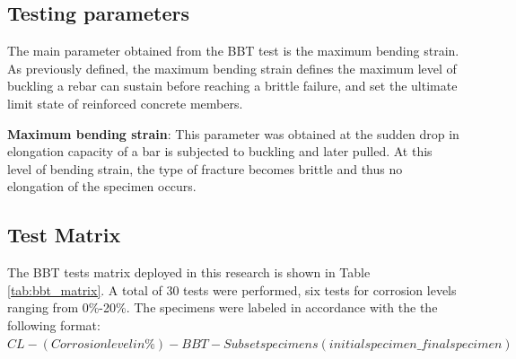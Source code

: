 \newpage

\subsection{Testing parameters}

The main parameter obtained from the BBT test is the maximum bending strain. As previously defined, the maximum bending strain defines the maximum level of buckling a rebar can sustain before reaching a brittle failure, and set the ultimate limit state of reinforced concrete members.

\textbf{Maximum bending strain}: This parameter was obtained at the sudden drop in elongation capacity of a bar is subjected to buckling and later pulled. At  this level of bending strain, the type of fracture becomes brittle and thus no elongation of the specimen occurs.

\subsection{Test Matrix}
The BBT tests matrix deployed in this research is shown in Table \ref{tab:bbt_matrix}. A total of 30 tests were performed, six tests for corrosion levels ranging from 0\%-20\%. The specimens were labeled in accordance with the the following format:
\newline
$CL-(Corrosion level in  \%)-BBT-Subset specimens (initial specimen\_final specimen)$

